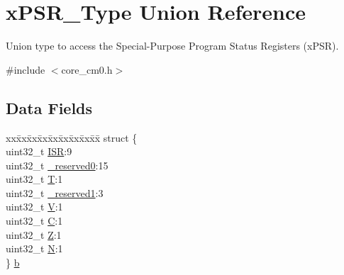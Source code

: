 \hypertarget{unionx_p_s_r___type}{}\section{x\+P\+S\+R\+\_\+\+Type Union Reference}
\label{unionx_p_s_r___type}


Union type to access the Special-\/\+Purpose Program Status Registers (x\+P\+SR).  




{\ttfamily \#include $<$core\+\_\+cm0.\+h$>$}

\subsection*{Data Fields}
\begin{DoxyCompactItemize}
\item 
\begin{tabbing}
xx\=xx\=xx\=xx\=xx\=xx\=xx\=xx\=xx\=\kill
struct \{\\
\>uint32\_t \hyperlink{unionx_p_s_r___type_ad502ba7dbb2aab5f87c782b28f02622d}{ISR}:9\\
\>uint32\_t \hyperlink{unionx_p_s_r___type_ac8a6a13838a897c8d0b8bc991bbaf7c1}{\_reserved0}:15\\
\>uint32\_t \hyperlink{unionx_p_s_r___type_a6e1cf12e53a20224f6f62c001d9be972}{T}:1\\
\>uint32\_t \hyperlink{unionx_p_s_r___type_a959a73d8faee56599b7e792a7c5a2d16}{\_reserved1}:3\\
\>uint32\_t \hyperlink{unionx_p_s_r___type_acd4a2b64faee91e4a9eef300667fa222}{V}:1\\
\>uint32\_t \hyperlink{unionx_p_s_r___type_a7a1caf92f32fe9ebd8d1fe89b06c7776}{C}:1\\
\>uint32\_t \hyperlink{unionx_p_s_r___type_a5ae954cbd9986cd64625d7fa00943c8e}{Z}:1\\
\>uint32\_t \hyperlink{unionx_p_s_r___type_abae0610bc2a97bbf7f689e953e0b451f}{N}:1\\
\} \hyperlink{unionx_p_s_r___type_a8d8c45d946ef8df11f4cac72c667e98b}{b}\\


\end{tabbing}
\end{DoxyCompactItemize}
